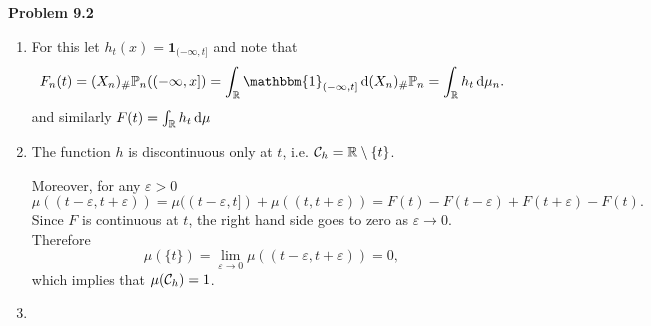 
\textbf{Problem 9.2}

\begin{enumerate}[label={(\alph*)}]
\item {}

For this let $h_t(x) = \mathbf{1}_{(-\infty,t]}$ and note that 
\[
	F_n(t) = (X_n)_\# \bbP_n ((-\infty,x]) = \int_\bbR \mathbbm{1}_{(-\infty,t]} \, \dd (X_n)_\# \bbP_n
	= \int_\bbR h_t \, \dd \mu_n.
\]
and similarly $F(t) = \int_{\mathbb R} h_t \, \mathrm{d} \mu$
\item {}

The function $h$ is discontinuous only at $t$, i.e. $\mathcal C_h = \mathbb R \setminus \{t\}$. 

Moreover, for any $\varepsilon > 0$
\[
	\mu((t-\varepsilon, t+\varepsilon)) = \mu((t-\varepsilon,t]) + \mu((t,t+\varepsilon))
	= F(t) - F(t-\varepsilon) + F(t + \varepsilon) - F(t).
\]
Since $F$ is continuous at $t$, the right hand side goes to zero as $\varepsilon \to 0$. Therefore
\[
	\mu(\{t\}) = \lim_{\varepsilon \to 0} \mu((t-\varepsilon, t+\varepsilon)) = 0,
\]
which implies that $\mu(\mathcal C_h) = 1$.
\item {} 


\end{enumerate}

